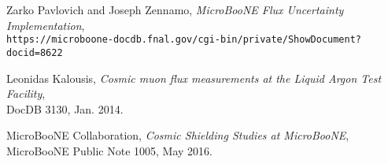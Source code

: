 \begin{thebibliography}{20}
  Zarko Pavlovich and Joseph Zennamo, \emph{MicroBooNE Flux Uncertainty Implementation},\\
  \texttt{https://microboone-docdb.fnal.gov/cgi-bin/private/ShowDocument?docid=8622}

Leonidas Kalousis, \emph{Cosmic muon flux measurements at the Liquid Argon Test Facility}, \\DocDB 3130, Jan. 2014. 

MicroBooNE Collaboration, \emph{Cosmic Shielding Studies at MicroBooNE}, \\ MicroBooNE Public Note 1005, May 2016.


\end{thebibliography}

